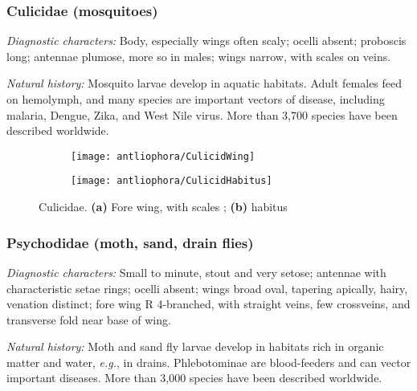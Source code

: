 \subsubsection{Culicidae (mosquitoes)}
\noindent{}\textit{Diagnostic characters:} Body, especially wings often scaly; ocelli absent; proboscis long; antennae plumose, more so in males; wings narrow, with scales on veins.\vspace{3mm}

\noindent{}\textit{Natural history:} Mosquito larvae develop in aquatic habitats. Adult females feed on hemolymph, and many species are important vectors of disease, including malaria, Dengue, Zika, and West Nile virus. More than 3,700 species have been described worldwide.

\begin{figure}[ht!]
    \centering
    \begin{subfigure}[ht!]{0.45\textwidth}
        \texttt{[image: antliophora/CulicidWing]}
        \caption{}
        \label{fig:culic1}
    \end{subfigure}
    \qquad
    \begin{subfigure}[ht!]{0.45\textwidth}
        \texttt{[image: antliophora/CulicidHabitus]}
        \caption{}
        \label{fig:culic2}
    \end{subfigure}
    \caption{Culicidae. \textbf{(a)} Fore wing, with scales \citep[][Fig. 25.5]{mcalpine1981manual}; \textbf{(b)} habitus \citep[][Fig. 25.1]{mcalpine1981manual}}\label{fig:culicids}
\end{figure}

\subsubsection{Psychodidae (moth, sand, drain flies)}
\noindent{}\textit{Diagnostic characters:} Small to minute, stout and very setose;  antennae with characteristic setae rings; ocelli absent; wings broad oval, tapering apically, hairy, venation distinct; fore wing R 4-branched, with straight veins, few crossveins, and transverse fold near base of wing.\vspace{3mm}

\noindent{}\textit{Natural history:} Moth and sand fly larvae develop in habitats rich in organic matter and water, \textit{e.g.}, in drains. Phlebotominae are blood-feeders and can vector important diseases. More than 3,000 species have been described worldwide.

